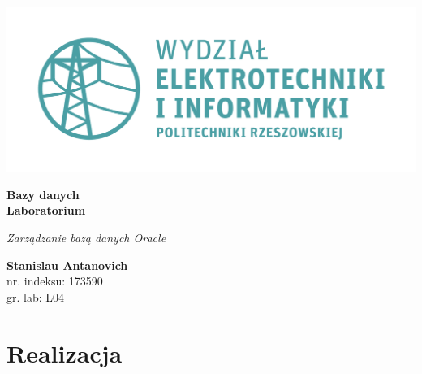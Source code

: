 \documentclass[a4paper, 10pt]{article}
\begin{document}
\begin{titlepage}
\begin{center}
	\includegraphics[scale=0.7]{logo.png}

	\vspace*{4cm}
	\textbf{Bazy danych\\ Laboratorium}

	\vspace{1.5cm}
	\textit{Zarządzanie bazą danych Oracle}

	\vspace{1.5cm}
	\textbf{Stanislau Antanovich}\\
	nr. indeksu: 173590\\
	gr. lab: L04

	\vspace{4.5cm}
\end{center}
\end{titlepage}

\tableofcontents
\listoffigures
\lstlistoflistings

\newpage

\section{Realizacja}
\end{document}
